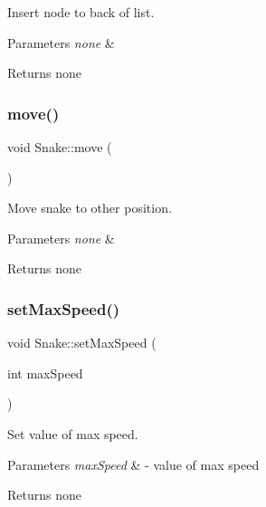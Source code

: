 Insert node to back of list. 


\begin{DoxyParams}{Parameters}
{\em none} & \\
\hline
\end{DoxyParams}
\begin{DoxyReturn}{Returns}
none 
\end{DoxyReturn}
\mbox{\label{class_snake_a5aea260c328ba4f8701539eab08283d9}} 
\subsubsection{\texorpdfstring{move()}{move()}}
{\footnotesize\ttfamily void Snake\+::move (\begin{DoxyParamCaption}{ }\end{DoxyParamCaption})}



Move snake to other position. 


\begin{DoxyParams}{Parameters}
{\em none} & \\
\hline
\end{DoxyParams}
\begin{DoxyReturn}{Returns}
none 
\end{DoxyReturn}
\mbox{\label{class_snake_a1d32911132c48ffb2cbe6752b5100405}} 
\subsubsection{\texorpdfstring{set\+Max\+Speed()}{setMaxSpeed()}}
{\footnotesize\ttfamily void Snake\+::set\+Max\+Speed (\begin{DoxyParamCaption}\item[{int}]{max\+Speed }\end{DoxyParamCaption})}



Set value of max speed. 


\begin{DoxyParams}{Parameters}
{\em max\+Speed} & -\/ value of max speed \\
\hline
\end{DoxyParams}
\begin{DoxyReturn}{Returns}
none 
\end{DoxyReturn}
\mbox{\label{class_snake_a9dd0a8a2a763668e12646385da8280e2}} 

